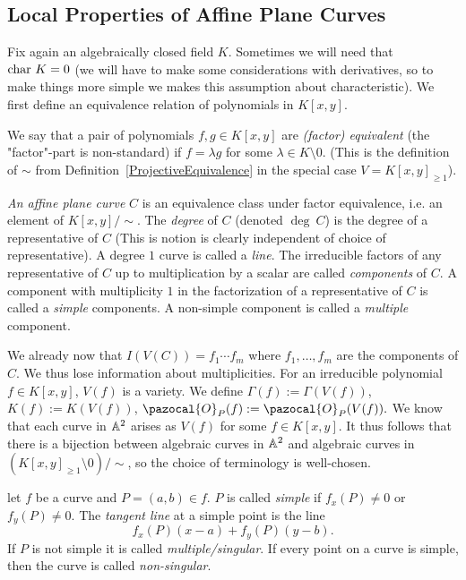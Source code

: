 \subsection{Local Properties of Affine Plane Curves}
    Fix again an algebraically closed field $K$. Sometimes we will need that $\mathrm{char} \ K =0$ (we will have to make some considerations with derivatives, so to make things more simple we makes this assumption about characteristic). We first define an equivalence relation of polynomials in $K[x,y]$.
    \begin{definition}
        We say that a pair of polynomials $f,g\in K[x,y]$ are \textit{(factor) equivalent} (the "factor"-part is non-standard) if $f=\lambda g$ for some $\lambda\in K\setminus 0$. (This is the definition of $\sim$ from Definition~\ref{ProjectiveEquivalence} in the special case $V=K[x,y]_{\geq 1}$). 
    \end{definition}
    \begin{definition}
        \textit{An affine plane curve} $C$ is an equivalence class under factor equivalence, i.e. an element of $K[x,y]/\sim$. The \textit{degree} of $C$ (denoted $\deg\ C$) is the degree of a representative of $C$ (This is notion is clearly independent of choice of representative). A degree $1$ curve is called a \textit{line}. The irreducible factors of any representative of $C$ up to multiplication by a scalar are called \textit{components} of $C$. A component with multiplicity $1$ in the factorization of a representative of $C$ is called a \textit{simple} components. A non-simple component is called a \textit{multiple} component.
    \end{definition}
    \begin{remark}
        We already now that $I(V(C))=f_1\cdots f_m$ where $f_1,\dots,f_m$ are the components of $C$. We thus lose information about multiplicities. For an irreducible polynomial $f\in K[x,y]$, $V(f)$ is a variety. We define $\Gamma(f):= \Gamma(V(f))$, $K(f):= K(V(f))$, $\pazocal{O}_P(f):=\pazocal{O}_P(V(f)).$ We know that each curve in $\mathbb{A}^2$ arises as $V(f)$ for some $f\in K[x,y]$. It thus follows that there is a bijection between algebraic curves in $\mathbb{A}^2$ and algebraic curves in $(K[x,y]_{\geq 1}\setminus 0)/\sim$, so the choice of terminology is well-chosen.  
    \end{remark}
    \begin{definition}
        let $f$ be a curve and $P=(a,b)\in f$. $P$ is called \textit{simple} if $f_x(P)\neq 0$ or $f_y(P)\neq 0$. The \textit{tangent line} at a simple point is the line 
        $$f_x(P)(x-a)+f_y(P)(y-b).$$
        If $P$ is not simple it is called \textit{multiple/singular}.
        If every point on a curve is simple, then the curve is called \textit{non-singular}.
    \end{definition}
